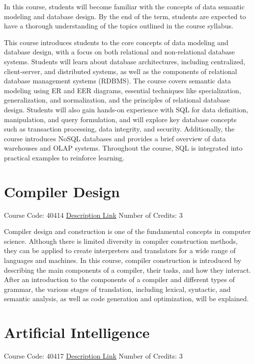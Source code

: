 In this course, students will become familiar with the concepts of data semantic modeling and database design. By the end of the term, students are expected to have a thorough understanding of the topics outlined in the course syllabus.

This course introduces students to the core concepts of data modeling and database design, with a focus on both relational and non-relational database systems. Students will learn about database architectures, including centralized, client-server, and distributed systems, as well as the components of relational database management systems (RDBMS). The course covers semantic data modeling using ER and EER diagrams, essential techniques like specialization, generalization, and normalization, and the principles of relational database design. Students will also gain hands-on experience with SQL for data definition, manipulation, and query formulation, and will explore key database concepts such as transaction processing, data integrity, and security. Additionally, the course introduces NoSQL databases and provides a brief overview of data warehouses and OLAP systems. Throughout the course, SQL is integrated into practical examples to reinforce learning.

\section{Compiler Design}
Course Code: 40414 \qquad \quad \href{https://docs.ce.sharif.edu/course/40414}{Description Link}
\qquad \quad Number of Credits: 3

Compiler design and construction is one of the fundamental concepts in computer science. Although there is limited diversity in compiler construction methods, they can be applied to create interpreters and translators for a wide range of languages and machines. In this course, compiler construction is introduced by describing the main components of a compiler, their tasks, and how they interact. After an introduction to the components of a compiler and different types of grammar, the various stages of translation, including lexical, syntactic, and semantic analysis, as well as code generation and optimization, will be explained.


\section{Artificial Intelligence}
Course Code: 40417 \qquad \quad \href{https://docs.ce.sharif.edu/course/40417}{Description Link}
\qquad \quad Number of Credits: 3

